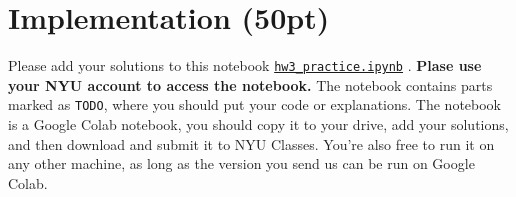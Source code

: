 \section{Implementation (50pt)}

Please add your solutions to this notebook
\href{https://drive.google.com/file/d/1k_zaJcLyUlfEvWI9rbrtN59hwRbyYJSZ/view?usp=sharing}{\texttt{hw3\_practice.ipynb}}
.
\textbf{Plase use your NYU account to access the notebook.} The notebook contains parts marked as \texttt{TODO}, where you should put your code or explanations. The notebook is a Google Colab notebook, you should copy it to your drive, add your solutions, and then download and submit it to NYU Classes. You're also free to run it on any other machine, as long as the version you send us can be run on Google Colab.